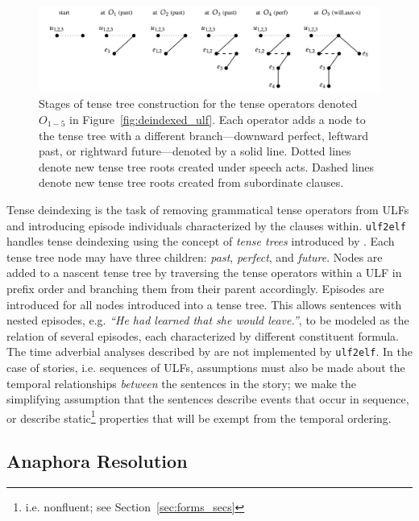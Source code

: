 \begin{figure}
    \centering
    \includegraphics[width=\columnwidth]{CH2_el/tensetrees.pdf}
    \caption{Stages of tense tree construction for the tense operators denoted $O_{1-5}$ in Figure~\ref{fig:deindexed_ulf}. Each operator adds a node to the tense tree with a different branch---downward perfect, leftward past, or rightward future---denoted by a solid line. Dotted lines denote new tense tree roots created under speech acts. Dashed lines denote new tense tree roots created from subordinate clauses.}
    \label{fig:tensetrees}
\end{figure}

Tense deindexing is the task of removing grammatical tense operators from ULFs and introducing episode individuals characterized by the clauses within. \texttt{ulf2elf} handles tense deindexing using the concept of \textit{tense trees} introduced by \citet{hwang1994ICTL}. Each tense tree node may have three children: \textit{past}, \textit{perfect}, and \textit{future}. Nodes are added to a nascent tense tree by traversing the tense operators within a ULF in prefix order and branching them from their parent accordingly. Episodes are introduced for all nodes introduced into a tense tree. This allows sentences with nested episodes, e.g. \textit{``He had learned that she would leave.''}, to be modeled as the relation of several episodes, each characterized by different constituent formula. The time adverbial analyses described by \citet{hwang1994ICTL} are not implemented by \texttt{ulf2elf}. In the case of stories, i.e. sequences of ULFs, assumptions must also be made about the temporal relationships \textit{between} the sentences in the story; we make the simplifying assumption that the sentences describe events that occur in sequence, or describe static\footnote{i.e. nonfluent; see Section~\ref{sec:forms_secs}} properties that will be exempt from the temporal ordering.

\subsection{Anaphora Resolution}
\label{sec:anaphora_res}

